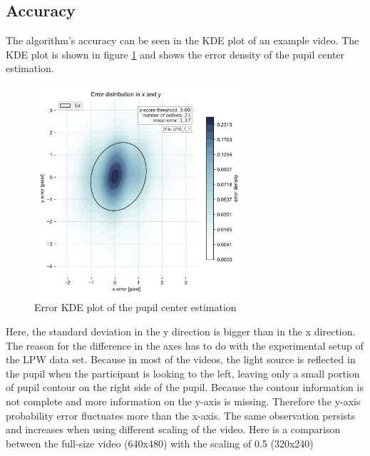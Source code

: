 \subsection{Accuracy}
The algorithm's accuracy can be seen in the KDE plot of an example video. The KDE plot is shown in figure \ref{fig:kde} and shows the error density of the pupil center estimation. 

\begin{figure}[h]
        \centering
        \includegraphics[width=0.7\textwidth]{plots/LPW_1_1pre.png}
    \caption{Error KDE plot of the pupil center estimation}
    \label{fig:kde}
\end{figure}
Here, the standard deviation in the y direction is bigger than in the x direction. The reason for the difference in the axes has to do with the experimental setup of the LPW data set. Because in most of the videos, the light source is reflected in the pupil when the participant is looking to the left, leaving only a small portion of pupil contour on the right side of the pupil. Because the contour information is not complete and more information on the y-axis is missing. Therefore the y-axis probability error fluctuates more than the x-axis. The same observation persists and increases when using different scaling of the video. Here is a comparison between the full-size video (640x480) with the scaling of 0.5 (320x240) 

